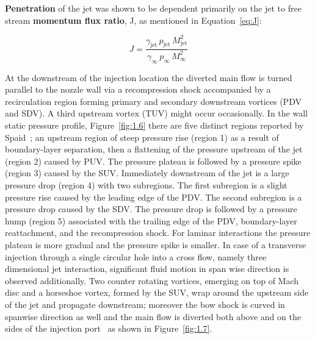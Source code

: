\documentclass[12pt]{article}
\begin{document}
\textbf{Penetration} of the jet was shown to be dependent primarily on the jet to free stream \textbf{momentum flux ratio}, J, as mentioned in Equation~\ref{eq:J}:

\begin{equation}
    J = \frac{\gamma_{\text{jet}} \, p_{\text{jet}} \, M_{\text{jet}}^2}{\gamma_\infty \, p_\infty \, M_\infty^2}
    \label{eq:J}
\end{equation}

At the downstream of the injection location the diverted main flow is turned parallel to the nozzle wall via a recompression shock accompanied by a recirculation region forming primary and secondary downstream vortices (PDV and SDV). A third upstream vortex (TUV) might occur occasionally. In the wall static pressure profile, Figure~\ref{fig:1.6} there are five distinct regions reported by Spaid~\cite{spaid1968study}; an upstream region of steep pressure rise (region 1) as a result of boundary-layer separation, then a flattening of the pressure upstream of the jet (region 2) caused by PUV. The pressure plateau is followed by a pressure spike (region 3) caused by the SUV. Immediately downstream of the jet is a large pressure drop (region 4) with two subregions. The first subregion is a slight pressure rise caused by the leading edge of the PDV. The second subregion is a pressure drop caused by the SDV. The pressure drop is followed by a pressure hump (region 5) associated with the trailing edge of the PDV, boundary-layer reattachment, and the recompression shock. For laminar interactions the pressure plateau is more gradual and the pressure spike is smaller. In case of a transverse injection through a single circular hole into a cross flow, namely three dimensional jet interaction, significant fluid motion in span wise direction is observed additionally. Two counter rotating vortices, emerging on top of Mach disc and a horseshoe vortex, formed by the SUV, wrap around the upstream side of the jet and propagate downstream; moreover the bow shock is curved in spanwise direction as well and the main flow is diverted both above and on the sides of the injection port~\cite{Gruber1995} as shown in Figure~\ref{fig:1.7}.
\end{document}
